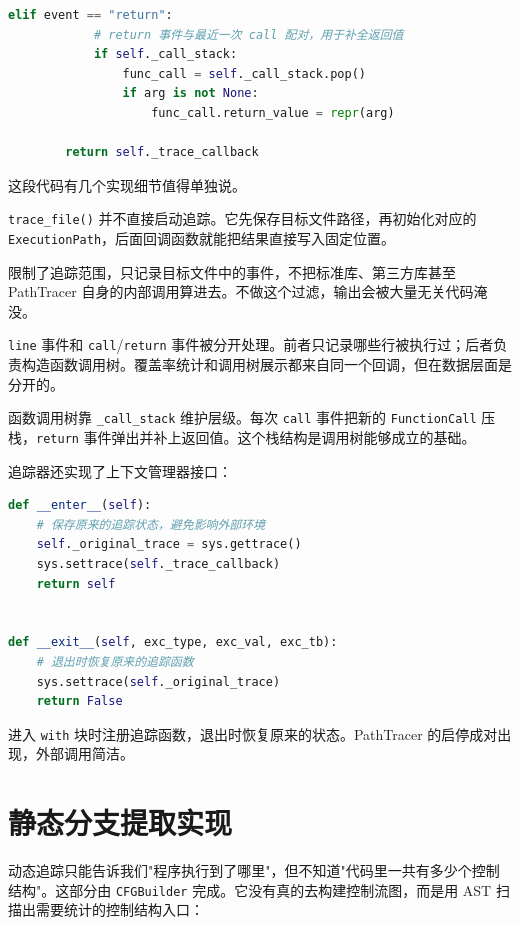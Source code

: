 \begin{lstlisting}[language=Python, caption={运行时追踪器的核心回调逻辑}]
        elif event == "return":
            # return 事件与最近一次 call 配对，用于补全返回值
            if self._call_stack:
                func_call = self._call_stack.pop()
                if arg is not None:
                    func_call.return_value = repr(arg)

        return self._trace_callback
\end{lstlisting}

这段代码有几个实现细节值得单独说。

\texttt{trace\_file()} 并不直接启动追踪。它先保存目标文件路径，再初始化对应的 \texttt{ExecutionPath}，后面回调函数就能把结果直接写入固定位置。

 限制了追踪范围，只记录目标文件中的事件，不把标准库、第三方库甚至 PathTracer 自身的内部调用算进去。不做这个过滤，输出会被大量无关代码淹没。

\texttt{line} 事件和 \texttt{call}/\texttt{return} 事件被分开处理。前者只记录哪些行被执行过；后者负责构造函数调用树。覆盖率统计和调用树展示都来自同一个回调，但在数据层面是分开的。

函数调用树靠 \texttt{\_call\_stack} 维护层级。每次 \texttt{call} 事件把新的 \texttt{FunctionCall} 压栈，\texttt{return} 事件弹出并补上返回值。这个栈结构是调用树能够成立的基础。

追踪器还实现了上下文管理器接口：

\begin{lstlisting}[language=Python, caption={追踪器的启停方式}]
def __enter__(self):
    # 保存原来的追踪状态，避免影响外部环境
    self._original_trace = sys.gettrace()
    sys.settrace(self._trace_callback)
    return self


def __exit__(self, exc_type, exc_val, exc_tb):
    # 退出时恢复原来的追踪函数
    sys.settrace(self._original_trace)
    return False
\end{lstlisting}

进入 \texttt{with} 块时注册追踪函数，退出时恢复原来的状态。PathTracer 的启停成对出现，外部调用简洁。

\section{静态分支提取实现}

动态追踪只能告诉我们"程序执行到了哪里"，但不知道"代码里一共有多少个控制结构"。这部分由 \texttt{CFGBuilder} 完成。它没有真的去构建控制流图，而是用 AST 扫描出需要统计的控制结构入口：

